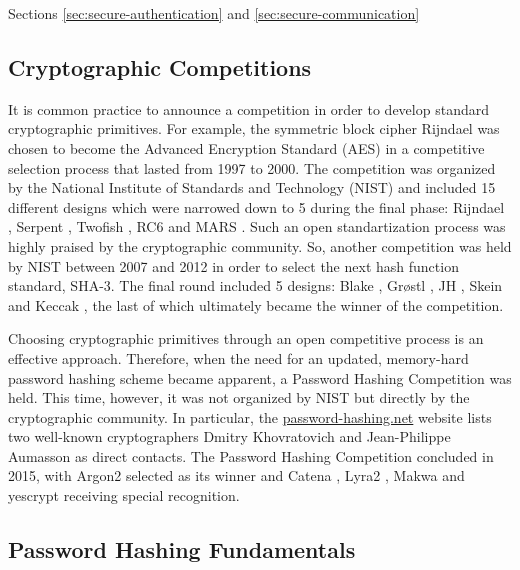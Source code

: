 Sections \ref{sec:secure-authentication} and \ref{sec:secure-communication}

\subsection{Cryptographic Competitions}
\label{sec:cryptocomps}

It is common practice to announce a competition in order to develop standard cryptographic primitives. For example, the symmetric block cipher Rijndael \cite{daemen:2002:DRA} was chosen to become the Advanced Encryption Standard (AES) \cite{aes-fips} in a competitive selection process that lasted from 1997 to 2000. The competition was organized by the National Institute of Standards and Technology (NIST) and included 15 different designs which were narrowed down to 5 during the final phase: Rijndael \cite{daemen:2002:DRA}, Serpent \cite{anderson:1988:serpent}, Twofish \cite{schneier:1998:twofish}, RC6 \cite{rivest:1998:rc6} and MARS \cite{burwick:1998:mars}. Such an open standartization process was highly praised by the cryptographic community. So, another competition was held by NIST between 2007 and 2012 in order to select the next hash function standard, SHA-3. The final round included 5 designs: Blake \cite{aumasson:2013:blake2}, Grøstl \cite{praveen:2011:groestl}, JH \cite{wu:2011:jh}, Skein \cite{ferguson:2009:skein} and Keccak \cite{cryptoeprint:2015:keccak}, the last of which ultimately became the winner of the competition.

Choosing cryptographic primitives through an open competitive process is an effective approach. Therefore, when the need for an updated, memory-hard password hashing scheme became apparent, a Password Hashing Competition was held. This time, however, it was not organized by NIST but directly by the cryptographic community. In particular, the \url{password-hashing.net} website lists two well-known cryptographers Dmitry Khovratovich and Jean-Philippe Aumasson as direct contacts. The Password Hashing Competition concluded in 2015, with Argon2 \cite{biryukov:2015:argon2} selected as its winner and Catena \cite{forler:2013:catena}, Lyra2 \cite{andrade:2016:lyra2}, Makwa \cite{pornin:2015:makwa} and yescrypt \cite{peslyak:2015:yescrypt} receiving special recognition.

\subsection{Password Hashing Fundamentals}
\label{sec:fundamentals}

